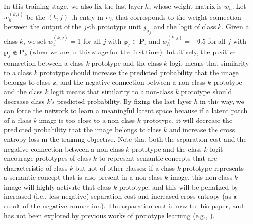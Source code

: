 \documentclass{article}
\theoremstyle{definition}
\theoremstyle{remark}
\begin{document}
In this training stage, we also fix the last layer $h$, whose weight matrix is $w_h$. Let $w_h^{(k, j)}$ be the \mbox{$(k, j)$-th} entry in $w_h$ that corresponds to the weight connection between the output of the $j$-th prototype unit $g_{\mathbf{p}_j}$ and the logit of class $k$. Given a class $k$, we set $w_h^{(k, j)} = 1$ for all $j$ with $\mathbf{p}_j \in \mathbf{P}_k$ and $w_h^{(k, j)} = -0.5$ for all $j$ with $\mathbf{p}_j \not\in \mathbf{P}_k$ (when we are in this stage for the first time). Intuitively, the positive connection between a class $k$ prototype and the class $k$ logit means that similarity to a class $k$ prototype should increase the predicted probability that the image belongs to class $k$, and the negative connection between a non-class $k$ prototype and the class $k$ logit means that similarity to a non-class $k$ prototype should decrease class $k$'s predicted probability. By fixing the last layer $h$ in this way, we can force the network to learn a meaningful latent space because if a latent patch of a class $k$ image is too close to a non-class $k$ prototype, it will decrease the predicted probability that the image belongs to class $k$ and increase the cross entropy loss in the training objective.
Note that both the separation cost and the negative connection between a non-class $k$ prototype and the class $k$ logit encourage prototypes of class $k$ to represent semantic concepts that are characteristic of class $k$ but not of other classes: if a class $k$ prototype represents a semantic concept that is also present in a non-class $k$ image, this non-class $k$ image will highly activate that class $k$ prototype, and this will be penalized by increased (i.e., less negative) separation cost and increased cross entropy (as a result of the negative connection). The separation cost is new to this paper, and has not been explored by previous works of prototype learning (e.g., \cite{branson2014bird,LiLiuChenRudin}). %
\end{document}
